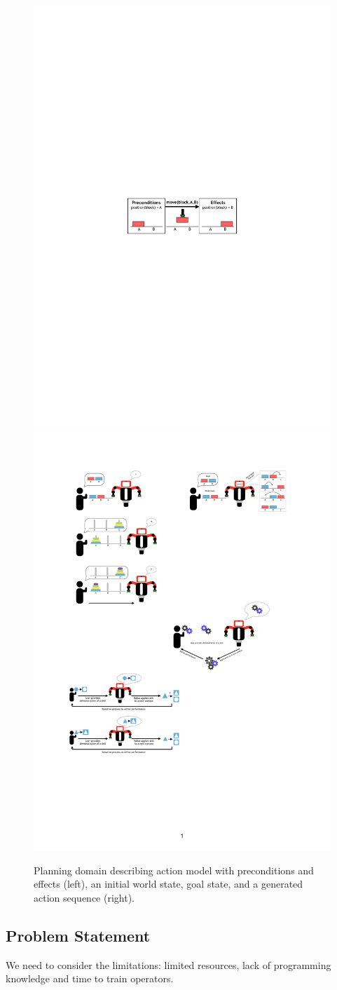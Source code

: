 \begin{figure}[htp]
	\centering
	\includegraphics[width=.4\linewidth]{figures/schema-logic-1}
	\includegraphics[width=.55\linewidth]{figures/PbD-AutomatedPlanner}
	\caption{Planning domain describing action model with preconditions and effects (left), an initial world state, goal state, and a generated action sequence (right).}
	\label{fig:Planning domain and action}
\end{figure}



\subsection{Problem Statement}
We need to consider the limitations: limited resources, lack of programming knowledge and time to train operators.

